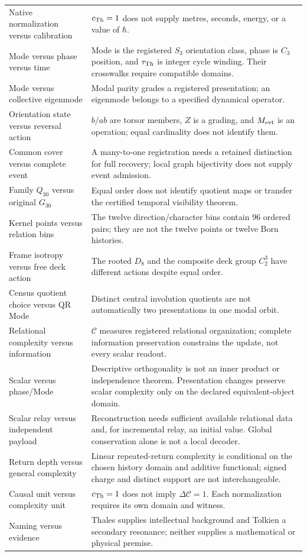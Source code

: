 \begin{longtable}{@{}p{}p{}@{}}
Native normalization versus calibration & $c_{\mathrm{Th}}=1$ does not supply metres, seconds, energy, or a value of $\hbar$. \\
Mode versus phase versus time & Mode is the registered $S_3$ orientation class, phase is $C_3$ position, and $\tau_{\mathrm{Th}}$ is integer cycle winding. Their crosswalks require compatible domains. \\
Mode versus collective eigenmode & Modal parity grades a registered presentation; an eigenmode belongs to a specified dynamical operator. \\
Orientation state versus reversal action & $b/ab$ are torsor members, $Z$ is a grading, and $M_{\mathrm{evt}}$ is an operation; equal cardinality does not identify them. \\
Common cover versus complete event & A many-to-one registration needs a retained distinction for full recovery; local graph bijectivity does not supply event admission. \\
Family $Q_{30}$ versus original $G_{30}$ & Equal order does not identify quotient maps or transfer the certified temporal visibility theorem. \\
Kernel points versus relation bins & The twelve direction/character bins contain $96$ ordered pairs; they are not the twelve points or twelve Born histories. \\
Frame isotropy versus free deck action & The rooted $D_8$ and the composite deck group $C_2^3$ have different actions despite equal order. \\
Census quotient choice versus QR Mode & Distinct central involution quotients are not automatically two presentations in one modal orbit. \\

Relational complexity versus information & $\mathcal C$ measures registered relational organization; complete information preservation constrains the update, not every scalar readout. \\
Scalar versus phase/Mode & Descriptive orthogonality is not an inner product or independence theorem. Presentation changes preserve scalar complexity only on the declared equivalent-object domain. \\
Scalar relay versus independent payload & Reconstruction needs sufficient available relational data and, for incremental relay, an initial value. Global conservation alone is not a local decoder. \\
Return depth versus general complexity & Linear repeated-return complexity is conditional on the chosen history domain and additive functional; signed charge and distinct support are not interchangeable. \\
Causal unit versus complexity unit & $c_{\mathrm{Th}}=1$ does not imply $\Delta\mathcal C=1$. Each normalization requires its own domain and witness. \\
Naming versus evidence & Thales supplies intellectual background and Tolkien a secondary resonance; neither supplies a mathematical or physical premise. \\


\end{longtable}
